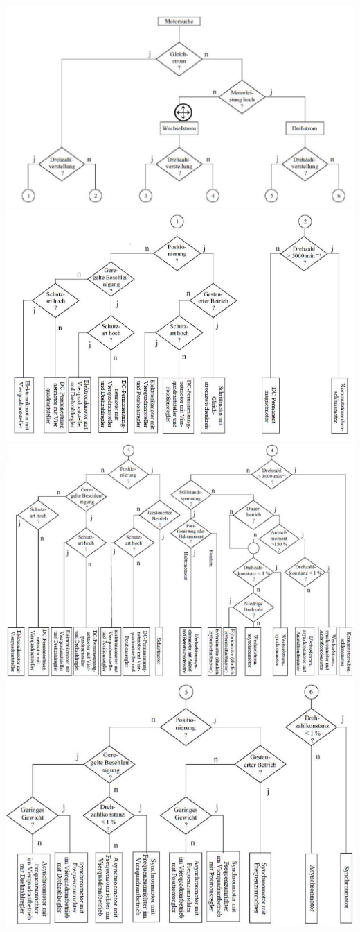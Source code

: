 \includegraphics[scale=1]{images/Motorauswahl}
\\
\includegraphics[scale=1]{images/Motorauswahl2}
\\
\includegraphics[scale=1]{images/Motorauswahl3}
\\
\includegraphics[scale=1]{images/Motorauswahl4}
\clearpage